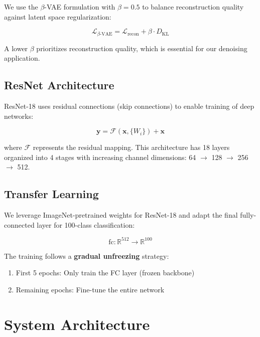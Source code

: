 \documentclass[11pt,a4paper]{article}
\begin{document}
We use the $\beta$-VAE formulation with $\beta = 0.5$ to balance reconstruction quality against latent space regularization:

\begin{equation}
    \mathcal{L}_{\beta\text{-VAE}} = \mathcal{L}_{\text{recon}} + \beta \cdot D_{\text{KL}}
\end{equation}

A lower $\beta$ prioritizes reconstruction quality, which is essential for our denoising application.

\subsection{ResNet Architecture}

ResNet-18 uses residual connections (skip connections) to enable training of deep networks:

\begin{equation}
    \mathbf{y} = \mathcal{F}(\mathbf{x}, \{W_i\}) + \mathbf{x}
\end{equation}

where $\mathcal{F}$ represents the residual mapping. This architecture has 18 layers organized into 4 stages with increasing channel dimensions: 64 $\rightarrow$ 128 $\rightarrow$ 256 $\rightarrow$ 512.

\subsection{Transfer Learning}

We leverage ImageNet-pretrained weights for ResNet-18 and adapt the final fully-connected layer for 100-class classification:

\begin{equation}
    \text{fc}: \mathbb{R}^{512} \rightarrow \mathbb{R}^{100}
\end{equation}

The training follows a \textbf{gradual unfreezing} strategy:
\begin{enumerate}
    \item First 5 epochs: Only train the FC layer (frozen backbone)
    \item Remaining epochs: Fine-tune the entire network
\end{enumerate}

\newpage
\section{System Architecture}
\label{sec:architecture}
\end{document}
